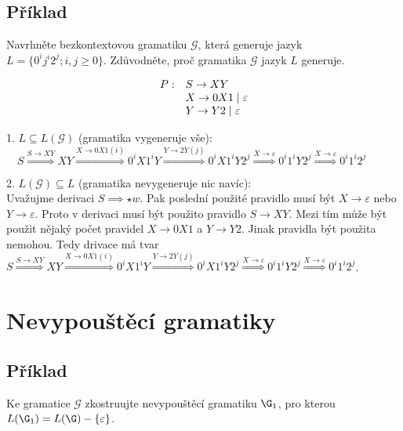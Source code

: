 \subsection{Příklad} 
\noindent
Navrhněte bezkontextovou gramatiku $\mathcal{G}$, která generuje jazyk $L = \{0^ij^i2^j; i, j \geq 0\}$. Zdůvodněte, 
proč gramatika $\mathcal{G}$ jazyk $L$ generuje. 

\[
    \begin{array}{l l}
        P: & S \rightarrow XY  \\
        & X \rightarrow 0X1 \mid \varepsilon  \\ 
        & Y \rightarrow Y2 \mid \varepsilon \\
    \end{array}
\]
\vspace*{3mm}

1. $L \subseteq L(\mathcal{G})$ (gramatika vygeneruje vše): \\

$\quad S \stackrel{S \rightarrow XY}{\Longrightarrow} XY \stackrel{X \rightarrow 0X1 (i)}{\Longrightarrow} 0^iX1^iY 
\stackrel{Y \rightarrow 2Y(j)}{\Longrightarrow} 0^iX1^iY2^j \stackrel{X \rightarrow \varepsilon}{\Longrightarrow} 
0^i1^iY2^j\stackrel{X \rightarrow \varepsilon}{\Longrightarrow} 0^i1^i2^j $

\vspace*{3mm}
2. $L(\mathcal{G}) \subseteq L$ (gramatika nevygeneruje nic navíc): \\

\noindent
Uvažujme derivaci $S \implies \star w$. Pak poslední použité pravidlo musí být $X \rightarrow \varepsilon$ nebo 
$Y \rightarrow \varepsilon$. Proto v derivaci musí být použito pravidlo $S \rightarrow XY$. Mezi tím může být použit 
nějaký počet pravidel $X \rightarrow 0X1$ a $Y \rightarrow Y2$. Jinak pravidla být použita nemohou. Tedy drivace má tvar 
$ S \stackrel{S \rightarrow XY}{\Longrightarrow} XY \stackrel{X \rightarrow 0X1 (i)}{\Longrightarrow} 0^iX1^iY 
\stackrel{Y \rightarrow 2Y(j)}{\Longrightarrow} 0^iX1^iY2^j \stackrel{X \rightarrow \varepsilon}{\Longrightarrow} 
0^i1^iY2^j\stackrel{X \rightarrow \varepsilon}{\Longrightarrow} 0^i1^i2^j $.

\section*{Nevypouštěcí gramatiky}

\subsection{Příklad}
\noindent
Ke gramatice $\mathcal{G}$ zkostruujte nevypouštěcí gramatiku $\G_1$, pro kterou $L(\G_1) = L(\G) - \{\varepsilon\}$.

